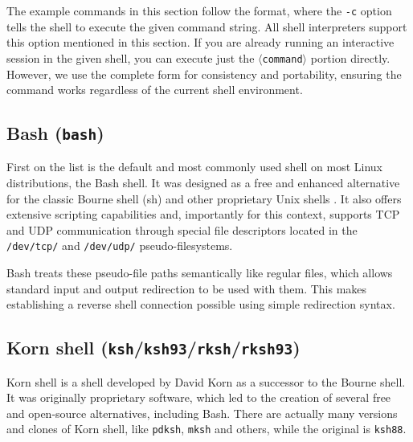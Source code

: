 The example commands in this section follow the  format, where the \texttt{-c} option tells the shell to execute the given command string. All shell interpreters support this option mentioned in this section. If you are already running an interactive session in the given shell, you can execute just the \texttt{\textcolor{placeholder}{$\langle$command$\rangle$}} portion directly. However, we use the complete form for consistency and portability, ensuring the command works regardless of the current shell environment.


\subsection{Bash (\texttt{bash})}


First on the list is the default and most commonly used shell on most Linux distributions, the Bash shell. It was designed as a free and enhanced alternative for the classic Bourne shell (sh) and other proprietary Unix shells \cite{gnu-about}. It also offers extensive scripting capabilities and, importantly for this context, supports TCP and UDP communication through special file descriptors located in the \texttt{/dev/tcp/} and \texttt{/dev/udp/} pseudo-filesystems.

Bash treats these pseudo-file paths semantically like regular files, which allows standard input and output redirection to be used with them. This makes establishing a reverse shell connection possible using simple redirection syntax.



\subsection{Korn shell (\texttt{ksh}/\texttt{ksh93}/\texttt{rksh}/\texttt{rksh93})}


Korn shell is a shell developed by David Korn as a successor to the Bourne shell. It was originally proprietary software, which led to the creation of several free and open-source alternatives, including Bash. There are actually many versions and clones of Korn shell, like \texttt{pdksh}, \texttt{mksh} and others, while the original is \texttt{ksh88}.

